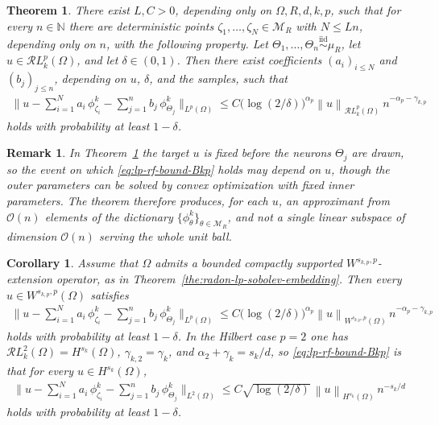 \documentclass[12pt]{article}
\numberwithin{equation}{section}
\newtheorem{remark}{Remark}
\newtheorem{theorem}{Theorem}[section]
\newtheorem{corollary}{Corollary}[section]
\numberwithin{figure}{section}
\numberwithin{equation}{section}
\newcommand{\N}{\mathbb{N}}
\newcommand{\MR}{\mathcal M_R}
\newcommand{\norm}[1]{\left\|#1\right\|}
\begin{document}
\begin{theorem}
\label{thm:high-prob-random-feature}
There exist $L,C>0$, depending only on $\Omega,R,d,k,p$, such that for every
$n\in\N$ there are deterministic points $\zeta_1,\dots,\zeta_N\in\MR$ with
$N\le Ln$, depending only on $n$, with the following property. Let
$\Theta_1,\dots,\Theta_n\overset{\mathrm{iid}}\sim\mu_R$, let
$u\in\mathcal{R}L^p_k(\Omega)$, and let $\delta\in(0,1)$. Then there exist
coefficients $(a_i)_{i\le N}$ and $(b_j)_{j\le n}$, depending on $u$, $\delta$,
and the samples, such that
\begin{align}
    \Big\|u-\sum_{i=1}^N a_i\,\phi^k_{\zeta_i}-\sum_{j=1}^n b_j\,\phi^k_{\Theta_j}
    \Big\|_{L^p(\Omega)}
    \le
    C\bigl(\log(2/\delta)\bigr)^{\alpha_p}
    \norm{u}_{\mathcal{R}L^p_k(\Omega)}\
    n^{-\alpha_p-\gamma_{k,p}}
    \label{eq:lp-rf-bound-Bkp}
\end{align}
holds with probability at least $1-\delta$.
\end{theorem}
\begin{remark}
    \label{rem:per-target-statement}
    In Theorem~\ref{thm:high-prob-random-feature} the target $u$ is fixed before the
    neurons $\Theta_j$ are drawn, so the event on which \eqref{eq:lp-rf-bound-Bkp}
    holds may depend on $u$, though the outer parameters can be solved by convex optimization
    with fixed inner parameters. The theorem therefore produces, for each $u$, an
    approximant from $\mathcal{O}(n)$ elements of the dictionary
    $\{\phi^k_\theta\}_{\theta\in\mathcal{M}_R}$, and not a single linear subspace of dimension
    $\mathcal{O}(n)$ serving the whole unit ball. 
\end{remark}
\begin{corollary}
\label{cor:rf-sobolev}
Assume that $\Omega$ admits a bounded compactly supported
$W^{s_{k,p},p}$-extension operator, as in
Theorem~\ref{the:radon-lp-sobolev-embedding}. Then every
$u\in W^{s_{k,p},p}(\Omega)$ satisfies
\begin{align}
    \Big\|u-\sum_{i=1}^N a_i\,\phi^k_{\zeta_i}-\sum_{j=1}^n b_j\,\phi^k_{\Theta_j}
    \Big\|_{L^p(\Omega)}
    \le
    C\bigl(\log(2/\delta)\bigr)^{\alpha_p}
    \norm{u}_{W^{s_{k,p},p}(\Omega)}\,
    n^{-\alpha_p-\gamma_{k,p}}
    \label{eq:lp-rf-bound-sobolev}
\end{align}
holds with probability at least $1-\delta$.
In the Hilbert case $p=2$ one has $\mathcal{R}L^2_k(\Omega)=H^{s_k}(\Omega)$,
$\gamma_{k,2}=\gamma_k$, and $\alpha_2+\gamma_k=s_k/d$, so
\eqref{eq:lp-rf-bound-Bkp} is that for every $u\in H^{s_k}(\Omega)$,
\begin{align}
    \Big\|u-\sum_{i=1}^N a_i\,\phi^k_{\zeta_i}-\sum_{j=1}^n b_j\,\phi^k_{\Theta_j}
    \Big\|_{L^2(\Omega)}
    \le
    C\sqrt{\log(2/\delta)}\,\norm{u}_{H^{s_k}(\Omega)}\,n^{-s_k/d}
    \label{eq:main-rf-bound}
\end{align}
holds with probability at least $1-\delta$.
\end{corollary}
\end{document}
